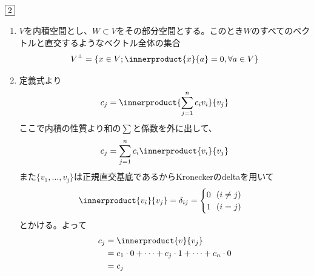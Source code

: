 \begin{souanswer} %
	$\fbox{2}$
\begin{enumerate}
	\item $V$を内積空間とし、$W\subset V$をその部分空間とする。このとき$W$のすべてのベクトルと直交するようなベクトル全体の集合
\begin{equation*}
	V^\perp= \{x\in V; \innerproduct{x}{a}= 0, \forall a\in V\}
\end{equation*}

	\item 定義式より
\begin{equation*}
	c_j= \innerproduct{\sum_{j= 1}^n c_iv_i}{v_j}
\end{equation*}
	ここで内積の性質より和の$\sum$と係数を外に出して、
\begin{equation*}
	c_j= \sum_{j= 1}^n c_i\innerproduct{v_i}{v_j}
\end{equation*}
	また$\{v_1, \ldots, v_j\}$は正規直交基底であるからKroneckerのdeltaを用いて
\begin{equation*}
	\innerproduct{v_i}{v_j}= \delta_{ij}= 
	\begin{cases}
		0\ \ (i\ne j)\\
		1\ \ (i= j)
	\end{cases}
\end{equation*}
	とかける。よって
\begin{align*}
	c_j
	&= \innerproduct{v}{v_j}\\
	&= c_1\cdot 0+ \cdots+ c_j\cdot 1+ \cdots+ c_n\cdot 0\\
	&= c_j	
\end{align*}


\end{enumerate}
\end{souanswer}
